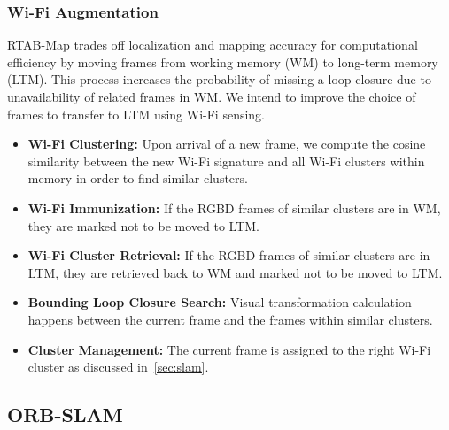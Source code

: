 \subsubsection{\textbf{Wi-Fi Augmentation}}
RTAB-Map trades off localization and mapping accuracy for computational efficiency by moving frames from working memory (WM) to long-term memory (LTM). This process increases the probability of missing a loop closure due to unavailability of related frames in WM. We intend to improve the choice of frames to transfer to LTM using Wi-Fi sensing. 
\begin{itemize}
\item \textbf{Wi-Fi Clustering:} Upon arrival of a new frame, we compute the cosine similarity between the new Wi-Fi signature and all Wi-Fi clusters within memory in order to find {similar clusters}. 
\item \textbf{Wi-Fi Immunization:} If the RGBD frames of {similar clusters} are in WM, they are marked not to be moved to LTM. 
\item \textbf{Wi-Fi Cluster Retrieval:} If the RGBD frames of {similar clusters} are in LTM, they are retrieved back to WM and marked not to be moved to LTM.
\item \textbf{Bounding Loop Closure Search:} Visual transformation calculation happens between the current frame and the frames within {similar clusters}.
\item \textbf{Cluster Management:} The current frame is assigned to the right Wi-Fi cluster as discussed in~\ref{sec:slam}.
\end{itemize}  
\subsection{ORB-SLAM}
